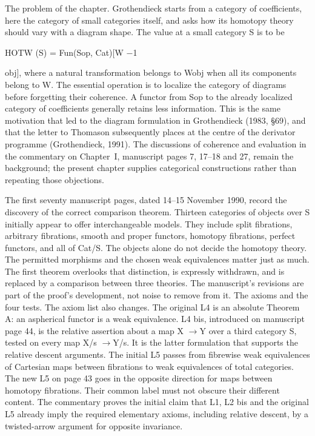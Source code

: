 The problem of the chapter. Grothendieck starts from a category of coefficients, here the category of small categories itself, and asks how its homotopy theory should vary with a diagram shape. The value at a small category S is to be


HOTW (S) = Fun(Sop, Cat)[W \ensuremath{-}1


obj], where a natural transformation belongs to Wobj when all its components belong to W. The essential operation is to localize the category of diagrams before forgetting their coherence. A functor from Sop to the already localized category of coefficients generally retains less information. This is the same motivation that led to the diagram formulation in Grothendieck (1983, \S{}69), and that the letter to Thomason subsequently places at the centre of the derivator programme (Grothendieck, 1991). The discussions of coherence and evaluation in the commentary on Chapter~I, manuscript pages 7, 17--18 and 27, remain the background; the present chapter supplies categorical constructions rather than repeating those objections.


The first seventy manuscript pages, dated 14--15 November 1990, record the discovery of the correct comparison theorem. Thirteen categories of objects over S initially appear to offer interchangeable models. They include split fibrations, arbitrary fibrations, smooth and proper functors, homotopy fibrations, perfect functors, and all of Cat/S. The objects alone do not decide the homotopy theory. The permitted morphisms and the chosen weak equivalences matter just as much. The first theorem overlooks that distinction, is expressly withdrawn, and is replaced by a comparison between three theories. The manuscript’s revisions are part of the proof’s development, not noise to remove from it. The axioms and the four tests. The axiom list also changes. The original L4 is an absolute Theorem A: an aspherical functor is a weak equivalence. L4 bis, introduced on manuscript page 44, is the relative assertion about a map X \ensuremath{\to}Y over a third category S, tested on every map X/s \ensuremath{\to}Y/s. It is the latter formulation that supports the relative descent arguments. The initial L5 passes from fibrewise weak equivalences of Cartesian maps between fibrations to weak equivalences of total categories. The new L5 on page 43 goes in the opposite direction for maps between homotopy fibrations. Their common label must not obscure their different content. The commentary proves the initial claim that L1, L2 bis and the original L5 already imply the required elementary axioms, including relative descent, by a twisted-arrow argument for opposite invariance.


